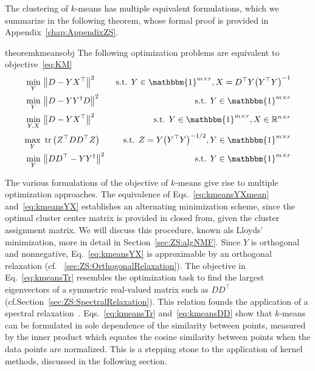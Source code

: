 The clustering of $k$-means has multiple equivalent formulations, which we summarize in the following theorem, whose formal proof is provided in Appendix~\ref{chap:AppendixZS}.
\begin{restatable}{theorem}{kmeansobj}\label{thm:kmeansobj}
The following optimization problems are equivalent to objective~\eqref{eq:KM}
\begin{align}
\min_{Y}\ &\bigl\lVert D-YX^\top\bigr\rVert ^2 &\text{ s.t. } Y\in\mathbbm{1}^{m\times r}, X=D^\top Y\bigl(Y^\top Y\bigr)^{-1} \label{eq:kmeansYXmean} \\
\min_{Y}\ &\bigl\lVert D-YY^\dagger D\bigr\rVert ^2 &\text{ s.t. } Y\in\mathbbm{1}^{m\times r} \label{eq:kmeansYYdaggerD} \\
\min_{Y,X}\ &\bigl\lVert D-YX^\top\bigr\rVert ^2 &\text{ s.t. } Y\in\mathbbm{1}^{m\times r}, X\in\mathbb{R}^{n\times r} \label{eq:kmeansYX} \\
\max_{Y}\ &\tr\left(Z^\top DD^\top Z\right)&\text{ s.t. } Z= Y\bigl(Y^\top Y\bigr)^{-1/2}, Y\in\mathbbm{1}^{m\times r} \label{eq:kmeansTr} \\
\min_{Y}\ &\bigl\lVert DD^\top - YY^\dagger\bigr\rVert ^2 &\text{ s.t. }   Y\in\mathbbm{1}^{m\times r} \label{eq:kmeansDD}
\end{align}
\end{restatable}
The various formulations of the objective of $k$-means give rise to multiple optimization approaches. The equivalence of Eqs.~\eqref{eq:kmeansYXmean} and~\eqref{eq:kmeansYX} establishes an alternating minimization scheme, since the optimal cluster center matrix is provided in closed from, given the cluster assignment matrix. We will discuss this procedure, known als Lloyds' minimization, more in detail in Section~\ref{sec:ZS:algNMF}. Since $Y$ is orthogonal and nonnegative, Eq.~\eqref{eq:kmeansYX} is approximable by an orthogonal relaxation (cf. \@Section~\ref{sec:ZS:OrthogonalRelaxation}).
The objective in Eq.~\eqref{eq:kmeansTr} resembles the optimization task to find the largest eigenvectors of a symmetric real-valued matrix such as $DD^\top$ (cf.\@ Section~\ref{sec:ZS:SpectralRelaxation}). This relation founds the application of a spectral relaxation~\citep{zha2002spectral}. 
Eqs.~\@\eqref{eq:kmeansTr} and~\@\eqref{eq:kmeansDD} show that $k$-means can be formulated in sole dependence of the similarity between points, measured by the inner product which equates the cosine similarity between points when the data points are normalized. This is a stepping stone to the application of kernel methods, discussed in the following section.

